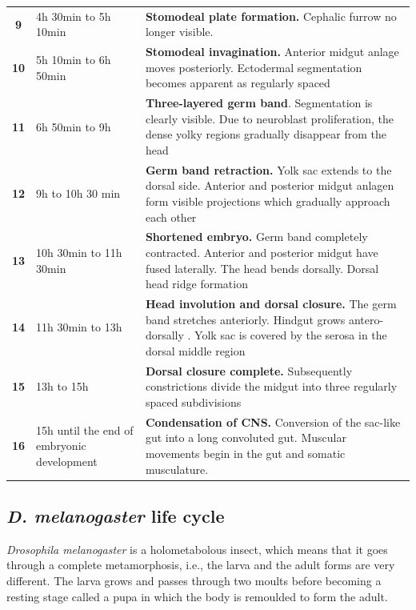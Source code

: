 \begin{table}
\begin{tabular}{|c|p{3.5cm}|p{14cm}|}
%
\textbf{9}	& 4h 30min to 5h 10min	& \textbf{Stomodeal plate formation.} Cephalic furrow no longer visible. 	 	\\
%
\textbf{10}	& 5h 10min to 6h 50min	& \textbf{Stomodeal invagination.} Anterior midgut anlage moves posteriorly. Ectodermal segmentation becomes apparent as regularly spaced	\\
%
\textbf{11}	& 6h 50min to 9h 	& \textbf{Three-layered germ band}. Segmentation is clearly visible. Due to neuroblast proliferation, the dense yolky regions gradually disappear from the head	\\
%
\textbf{12}	& 9h to 10h 30 min	& \textbf{Germ band retraction.} Yolk sac extends to the dorsal side. Anterior and posterior midgut anlagen form visible projections which gradually approach each other	\\
%
\textbf{13}	& 10h 30min to 11h 30min	& \textbf{Shortened embryo.} Germ band completely contracted. Anterior and posterior midgut have fused laterally. The head bends dorsally. Dorsal head ridge formation \\
%
\textbf{14}	& 11h 30min to 13h	& \textbf{Head involution and dorsal closure.} The germ band stretches anteriorly. Hindgut grows antero-dorsally	. Yolk sac is covered by the serosa in the dorsal middle region\\
%
\textbf{15}	& 13h to 15h 	& \textbf{Dorsal closure complete.} Subsequently constrictions divide the midgut into three regularly spaced subdivisions	\\
%
\textbf{16}	& 15h until the end of embryonic development	& \textbf{Condensation of CNS.} Conversion of the sac-like gut into a long convoluted gut. Muscular movements begin in the gut and somatic musculature. 	\\
\hline
\end{tabular}
\end{table}

\subsection{\textit{D. melanogaster} life cycle}

\textit{Drosophila melanogaster} is a holometabolous insect, which means that it goes through a complete metamorphosis, i.e., the larva and the adult forms are very different.
The larva grows and passes through two moults before becoming a resting stage called a pupa in which
the body is remoulded to form the adult. 

